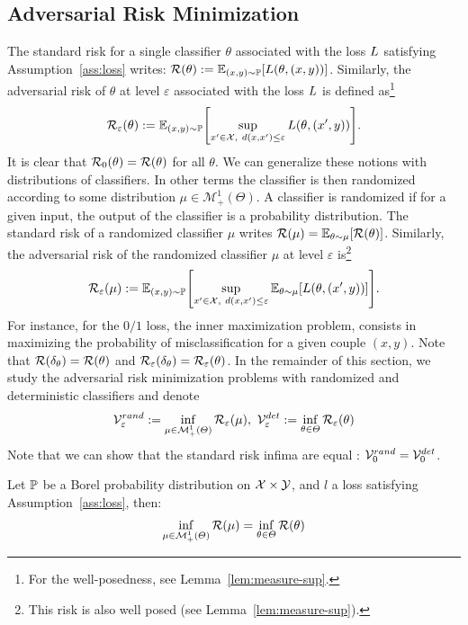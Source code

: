 \subsection{Adversarial Risk Minimization}
The standard risk for a single classifier $\theta$ associated with the loss $L$ satisfying Assumption~\ref{ass:loss} writes: $\risk(\theta):=\mathbb{E}_{(x,y)\sim \PP}\left[\loss(\theta,(x,y))\right]$. Similarly, the adversarial risk of $\theta$ at level $\varepsilon$ associated with the loss $L$ is defined as\footnote{For the well-posedness, see Lemma~\ref{lem:measure-sup}.}
\begin{align*}
    \risk_\varepsilon(\theta):=\mathbb{E}_{(x,y)\sim \PP}\left[\sup_{x'\in\XX,~d(x,x')\leq\varepsilon}\loss(\theta,(x',y))\right].
\end{align*}
 It is clear that $\mathcal{R}_0(\theta) =\mathcal{R}(\theta)$ for all $\theta$. We can generalize these notions with distributions of classifiers. In other terms the classifier is then randomized according to some distribution $\mu\in\mathcal{M}^1_+(\Theta)$. A classifier is randomized if for a given input, the output of the classifier is a probability distribution.
 The standard risk of a randomized classifier $\mu$ writes $\risk(\mu) = \mathbb{E}_{\theta\sim\mu}\left[\risk (\theta)\right]$. Similarly, the adversarial risk of the randomized classifier $\mu$ at level $\varepsilon$ is\footnote{This risk is also well posed (see Lemma~\ref{lem:measure-sup}).}
\begin{align*}
    \risk_\varepsilon(\mu):=\mathbb{E}_{(x,y)\sim \PP}\left[\sup_{x'\in\XX,~d(x,x')\leq\varepsilon}\mathbb{E}_{\theta\sim\mu}\left[\loss(\theta,(x',y))\right]\right].
\end{align*}
For instance, for the $0/1$ loss, the inner maximization problem, consists in maximizing the probability of misclassification for a given couple $(x,y)$. Note that $\mathcal{R}(\delta_\theta)=\mathcal{R}(\theta)$ and $\mathcal{R}_\varepsilon(\delta_\theta)=\mathcal{R}_\varepsilon(\theta)$. In the remainder of this section, we study the adversarial risk minimization problems with randomized and deterministic classifiers and denote
\begin{align}
\label{eq:advriskmin}
    \mathcal{V}^{rand}_\varepsilon:=\inf_{\mu\in\mathcal{M}^1_+(\Theta)} \mathcal{R}_\varepsilon(\mu),~\mathcal{V}^{det}_\varepsilon:=\inf_{\theta\in\Theta} \mathcal{R}_\varepsilon(\theta)
\end{align}
Note that we can show that the standard risk infima are equal :  $\mathcal{V}^{rand}_0=\mathcal{V}^{det}_0$. 
\begin{prop}
\label{prop:eqstandardrisk}
Let $\mathbb{P}$ be a Borel probability distribution on $\mathcal{X}\times\mathcal{Y}$, and $l$ a loss satisfying Assumption~\ref{ass:loss}, then:
\begin{align*}
        \inf_{\mu\in\mathcal{M}^1_+(\Theta)} \mathcal{R}(\mu) =\inf_{\theta\in\Theta} \mathcal{R}(\theta)
\end{align*}
\end{prop}
